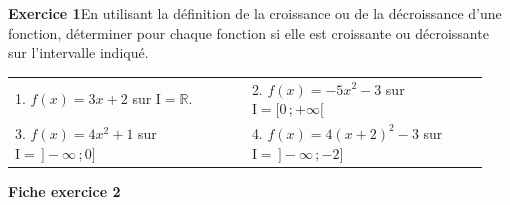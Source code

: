 \documentclass[11pt,a4paper]{article}
\begin{document}
\pagestyle{fancy}

\fancyhf{} %
\fancyhead[R]{ {\Niveau}}
\fancyhead[L]{ {\ChapitreCourt}}
\fancyhead[C]{ {\Document}}
\fancyfoot[R]{{\thepage\  / \pageref{LastPage}}}
% 

\noindent\textbf{Exercice 1}\quad En utilisant la définition de la croissance ou de la
décroissance d'une fonction, déterminer pour chaque fonction si elle est croissante ou
décroissante sur l'intervalle indiqué.

\medskip
\noindent\begin{tabular}{@{}p{0.47\linewidth}@{}p{0.47\linewidth}@{}}
1. $f(x)=3x+2$ sur $\mathrm{I}=\mathbb{R}$.
  & 2. $f(x)=-5x^{2}-3$ sur $\mathrm{I}=[0\,;+\infty[$ \\[0.9em]
3. $f(x)=4x^{2}+1$ sur $\mathrm{I}=\,]-\infty\,;0]$
  & 4. $f(x)=4(x+2)^{2}-3$ sur $\mathrm{I}=\,]-\infty\,;-2]$
\end{tabular}

\bigskip
\noindent\textbf{Fiche exercice 2}
\end{document}
